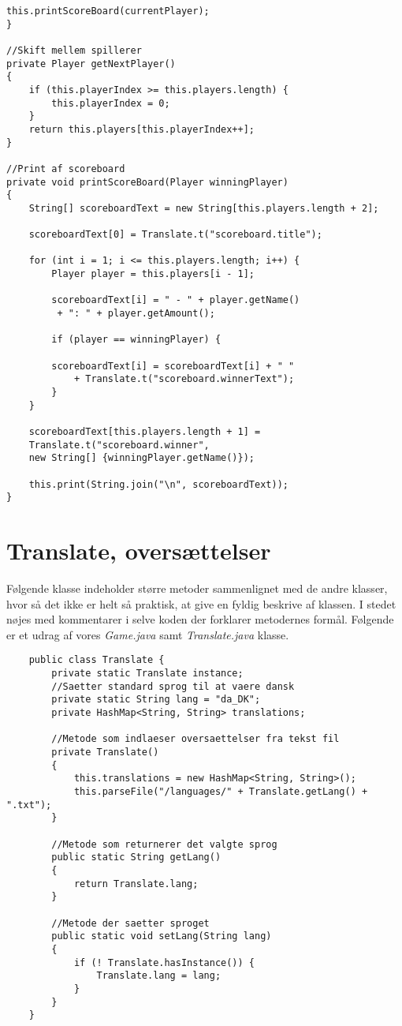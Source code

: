 \begin{lstlisting}
this.printScoreBoard(currentPlayer);
}

//Skift mellem spillerer
private Player getNextPlayer()
{
    if (this.playerIndex >= this.players.length) {
        this.playerIndex = 0;
    }
    return this.players[this.playerIndex++];
}

//Print af scoreboard
private void printScoreBoard(Player winningPlayer)
{
    String[] scoreboardText = new String[this.players.length + 2];

    scoreboardText[0] = Translate.t("scoreboard.title");

    for (int i = 1; i <= this.players.length; i++) {
        Player player = this.players[i - 1];

        scoreboardText[i] = " - " + player.getName()
         + ": " + player.getAmount();

        if (player == winningPlayer) {
           
        scoreboardText[i] = scoreboardText[i] + " " 
            + Translate.t("scoreboard.winnerText");
        }
    }

    scoreboardText[this.players.length + 1] =
    Translate.t("scoreboard.winner",
    new String[] {winningPlayer.getName()});

    this.print(String.join("\n", scoreboardText));
}

\end{lstlisting}
\vspace{2ex}

\section{Translate, oversættelser}
\noindent Følgende klasse indeholder større metoder sammenlignet med de andre klasser, hvor så det ikke er helt så praktisk, at give en fyldig beskrive af klassen.
I stedet nøjes med kommentarer i selve koden der forklarer metodernes formål.
Følgende er et udrag af vores \textit{Game.java} samt \textit{Translate.java} klasse.
\begin{lstlisting}
    public class Translate {
        private static Translate instance;
        //Saetter standard sprog til at vaere dansk
        private static String lang = "da_DK";
        private HashMap<String, String> translations;

        //Metode som indlaeser oversaettelser fra tekst fil
        private Translate()
        {
            this.translations = new HashMap<String, String>();
            this.parseFile("/languages/" + Translate.getLang() + ".txt");
        }
        
        //Metode som returnerer det valgte sprog 
        public static String getLang()
        {
            return Translate.lang;
        }
        
        //Metode der saetter sproget
        public static void setLang(String lang)
        {
            if (! Translate.hasInstance()) {
                Translate.lang = lang;
            }
        }
    }
\end{lstlisting}
\vspace{2ex}
